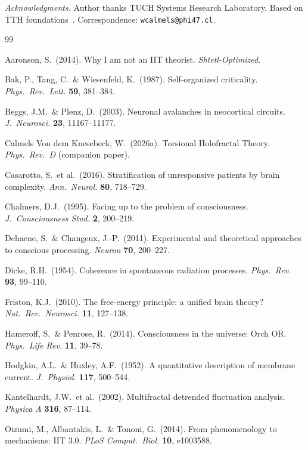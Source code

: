 \documentclass[12pt,a4paper]{article}
\numberwithin{equation}{section}
\begin{document}
\medskip\noindent
\textit{Acknowledgments.}
Author thanks TUCH Systems Research Laboratory.
Based on TTH foundations~\citep{Calmels2026a}.
Correspondence: \texttt{wcalmels@phi47.cl}.

\newpage
\begin{thebibliography}{99}

Aaronson, S.\ (2014). Why I am not an IIT theorist. \textit{Shtetl-Optimized}.

Bak, P., Tang, C.\ \& Wiesenfeld, K.\ (1987). Self-organized criticality.
\textit{Phys.\ Rev.\ Lett.} \textbf{59}, 381--384.

Beggs, J.M.\ \& Plenz, D.\ (2003). Neuronal avalanches in neocortical circuits.
\textit{J.\ Neurosci.} \textbf{23}, 11167--11177.

Calmels Von dem Knesebeck, W.\ (2026a). Torsional Holofractal Theory.
\textit{Phys.\ Rev.\ D} (companion paper).

Casarotto, S.\ et al.\ (2016). Stratification of unresponsive patients by brain complexity.
\textit{Ann.\ Neurol.} \textbf{80}, 718--729.

Chalmers, D.J.\ (1995). Facing up to the problem of consciousness.
\textit{J.\ Consciousness Stud.} \textbf{2}, 200--219.

Dehaene, S.\ \& Changeux, J.-P.\ (2011). Experimental and theoretical approaches to
conscious processing. \textit{Neuron} \textbf{70}, 200--227.

Dicke, R.H.\ (1954). Coherence in spontaneous radiation processes.
\textit{Phys.\ Rev.} \textbf{93}, 99--110.

Friston, K.J.\ (2010). The free-energy principle: a unified brain theory?
\textit{Nat.\ Rev.\ Neurosci.} \textbf{11}, 127--138.

Hameroff, S.\ \& Penrose, R.\ (2014). Consciousness in the universe: Orch OR.
\textit{Phys.\ Life Rev.} \textbf{11}, 39--78.

Hodgkin, A.L.\ \& Huxley, A.F.\ (1952). A quantitative description of membrane current.
\textit{J.\ Physiol.} \textbf{117}, 500--544.

Kantelhardt, J.W.\ et al.\ (2002). Multifractal detrended fluctuation analysis.
\textit{Physica A} \textbf{316}, 87--114.

Oizumi, M., Albantakis, L.\ \& Tononi, G.\ (2014). From phenomenology to mechanisms: IIT 3.0.
\textit{PLoS Comput.\ Biol.} \textbf{10}, e1003588.


\end{thebibliography}
\end{document}
